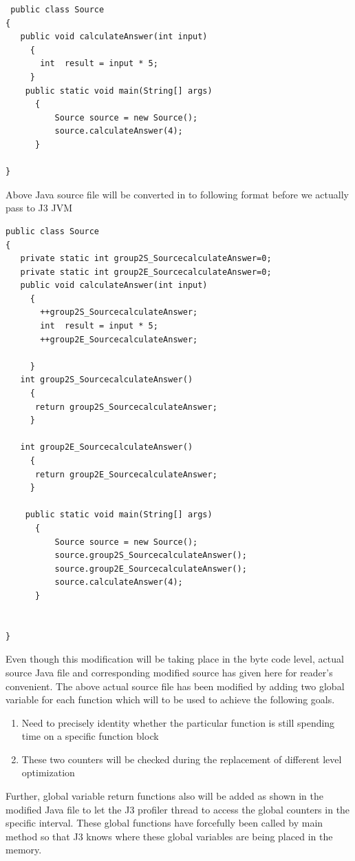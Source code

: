 \tiny\begin{verbatim}
 public class Source
{
   public void calculateAnswer(int input)
     {
       int  result = input * 5;
     }
    public static void main(String[] args)
      {
          Source source = new Source();
          source.calculateAnswer(4);
      }

}
\end{verbatim}
\normalsize
\scriptsize{Above Java source file will be converted in to following format before we actually pass to J3 JVM}
\tiny\begin{verbatim}
public class Source
{
   private static int group2S_SourcecalculateAnswer=0;
   private static int group2E_SourcecalculateAnswer=0;
   public void calculateAnswer(int input)
     {
       ++group2S_SourcecalculateAnswer;
       int  result = input * 5;
       ++group2E_SourcecalculateAnswer;

     }
   int group2S_SourcecalculateAnswer()
     {
      return group2S_SourcecalculateAnswer;
     }

   int group2E_SourcecalculateAnswer()
     {
      return group2E_SourcecalculateAnswer;
     }

    public static void main(String[] args)
      {
          Source source = new Source();
          source.group2S_SourcecalculateAnswer();
          source.group2E_SourcecalculateAnswer();
          source.calculateAnswer(4);
      }


}
\end{verbatim}
\normalsize
Even though this modification will be taking place in the byte code level, actual source Java file and corresponding modified source has given here for reader's convenient.  The above actual source file has been modified by adding two global variable for each function which will to be used to achieve the following goals.


\begin{enumerate}
  \item Need to precisely identity whether the particular function is still spending time on a specific function block
  \item These two counters will be checked during the replacement of different level optimization
\end{enumerate}

Further, global variable return functions also will be added as shown in the modified Java file to let the J3 profiler thread to access the global counters in the specific interval. These global functions have forcefully been called by main method so that J3 knows where these global variables are being placed in the memory.

